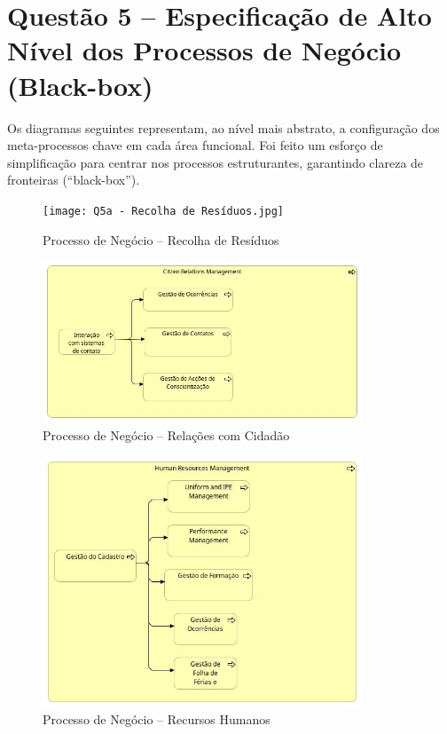 \documentclass[12pt,a4paper,final]{article}
\begin{document}
    \section*{Questão 5 – Especificação de Alto Nível dos Processos de Negócio (Black-box)}
    Os diagramas seguintes representam, ao nível mais abstrato, a configuração dos meta-processos chave em cada área funcional. Foi feito um esforço de simplificação para centrar nos processos estruturantes, garantindo clareza de fronteiras (“black-box”).

    \begin{figure}[H]
        \centering
        \texttt{[image: Q5a - Recolha de Resíduos.jpg]}
        \caption{Processo de Negócio – Recolha de Resíduos}
        \label{fig:q5-residuos}
    \end{figure}

    \begin{figure}[H]
        \centering
        \includegraphics[width=0.85\textwidth]{Q5b - Relações com Cidadão.jpg}
        \caption{Processo de Negócio – Relações com Cidadão}
        \label{fig:q5-cidadao}
    \end{figure}

    \begin{figure}[H]
        \centering
        \includegraphics[width=0.85\textwidth]{Q5c - Recursos Humanos.jpg}
        \caption{Processo de Negócio – Recursos Humanos}
        \label{fig:q5-rh}
    \end{figure}
\end{document}
